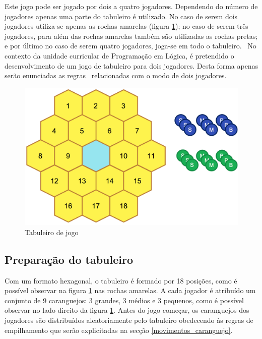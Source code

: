 \documentclass[a4paper]{article}
\begin{document}
Este jogo pode ser jogado por dois a quatro jogadores. Dependendo do número de jogadores apenas uma parte do tabuleiro é utilizado. No caso de serem dois jogadores utiliza-se apenas as rochas amarelas (figura \ref{Fig:tabuleiro}); no caso de serem três jogadores, para além das rochas amarelas também são utilizadas as rochas pretas; e por último no caso de serem quatro jogadores, joga-se em todo o tabuleiro.~\cite{blue_orange_games} No contexto da unidade curricular de Programação em Lógica, é pretendido o desenvolvimento de um jogo de tabuleiro para dois jogadores. Desta forma apenas serão enunciadas as regras~\cite{blue_orange} relacionadas com o modo de dois jogadores.

\begin{figure}[!ht]
	\begin{center}
	\includegraphics[scale=0.4]{img/board.png}
	\caption{Tabuleiro de jogo}
    \label{Fig:tabuleiro}
	\end{center}
\end{figure}
\newpage
\subsection{Preparação do tabuleiro}

Com um formato hexagonal, o tabuleiro é formado por 18 posições, como é possível observar na figura \ref{Fig:tabuleiro} nas rochas amarelas.
\newline
A cada jogador é atribuído um conjunto de 9 caranguejos: 3 grandes, 3 médios e 3 pequenos, como é possível observar no lado direito da figura \ref{Fig:tabuleiro}.
\newline
Antes do jogo começar, os caranguejos dos jogadores são distribuídos aleatoriamente pelo tabuleiro obedecendo às regras de empilhamento que serão explicitadas na secção \ref{movimentos_caranguejo}.
\end{document}
